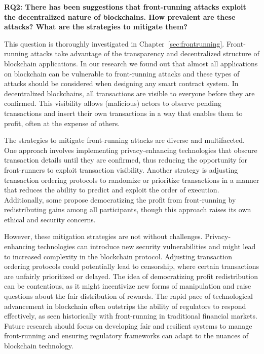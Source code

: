 \textbf{RQ2: There has been suggestions that front-running attacks exploit the decentralized nature of blockchains. How prevalent are these attacks? What are the strategies to mitigate them?}

This question is thoroughly investigated in Chapter~\ref{sec:frontrunning}. Front-running attacks take advantage of the transparency and decentralized structure of blockchain applications. In our research we found out that almost all applications on blockchain can be vulnerable to front-running attacks and these types of attacks should be considered when designing any smart contract system. In decentralized blockchains, all transactions are visible to everyone before they are confirmed. This visibility allows (malicious) actors to observe pending transactions and insert their own transactions in a way that enables them to profit, often at the expense of others. 

The strategies to mitigate front-running attacks are diverse and multifaceted. One approach involves implementing privacy-enhancing technologies that obscure transaction details until they are confirmed, thus reducing the opportunity for front-runners to exploit transaction visibility. Another strategy is adjusting transaction ordering protocols to randomize or prioritize transactions in a manner that reduces the ability to predict and exploit the order of execution. Additionally, some propose democratizing the profit from front-running by redistributing gains among all participants, though this approach raises its own ethical and security concerns.

However, these mitigation strategies are not without challenges. Privacy-enhancing technologies can introduce new security vulnerabilities and might lead to increased complexity in the blockchain protocol. Adjusting transaction ordering protocols could potentially lead to censorship, where certain transactions are unfairly prioritized or delayed. The idea of democratizing profit redistribution can be contentious, as it might incentivize new forms of manipulation and raise questions about the fair distribution of rewards. The rapid pace of technological advancement in blockchain often outstrips the ability of regulators to respond effectively, as seen historically with front-running in traditional financial markets. Future research should focus on developing fair and resilient systems to manage front-running and ensuring regulatory frameworks can adapt to the nuances of blockchain technology.

